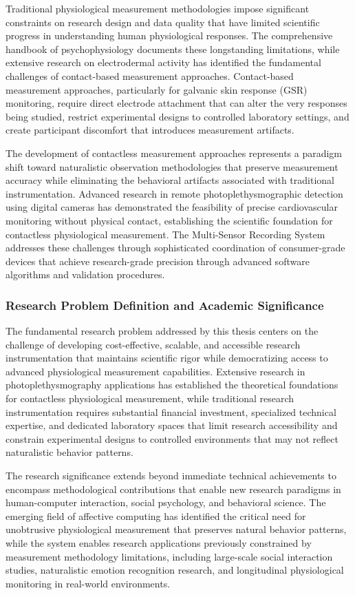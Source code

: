 \documentclass[11pt,a4paper]{report}
\begin{document}
Traditional physiological measurement methodologies impose significant constraints on research design and data quality
that have limited scientific progress in understanding human physiological responses. The comprehensive handbook of
psychophysiology documents these longstanding limitations, while extensive research on electrodermal activity has
identified the fundamental challenges of contact-based measurement approaches. Contact-based measurement approaches,
particularly for galvanic skin response (GSR) monitoring, require direct electrode attachment that can alter the very
responses being studied, restrict experimental designs to controlled laboratory settings, and create participant
discomfort that introduces measurement artifacts.

The development of contactless measurement approaches represents a paradigm shift toward naturalistic observation
methodologies that preserve measurement accuracy while eliminating the behavioral artifacts associated with traditional
instrumentation. Advanced research in remote photoplethysmographic detection using digital cameras has demonstrated the
feasibility of precise cardiovascular monitoring without physical contact, establishing the scientific foundation for
contactless physiological measurement. The Multi-Sensor Recording System addresses these challenges through
sophisticated coordination of consumer-grade devices that achieve research-grade precision through advanced software
algorithms and validation procedures.

\subsubsection{Research Problem Definition and Academic Significance}

The fundamental research problem addressed by this thesis centers on the challenge of developing cost-effective,
scalable, and accessible research instrumentation that maintains scientific rigor while democratizing access to advanced
physiological measurement capabilities. Extensive research in photoplethysmography applications has established the
theoretical foundations for contactless physiological measurement, while traditional research instrumentation requires
substantial financial investment, specialized technical expertise, and dedicated laboratory spaces that limit research
accessibility and constrain experimental designs to controlled environments that may not reflect naturalistic behavior
patterns.

The research significance extends beyond immediate technical achievements to encompass methodological contributions that
enable new research paradigms in human-computer interaction, social psychology, and behavioral science. The emerging
field of affective computing has identified the critical need for unobtrusive physiological measurement that preserves
natural behavior patterns, while the system enables research applications previously constrained by measurement
methodology limitations, including large-scale social interaction studies, naturalistic emotion recognition research,
and longitudinal physiological monitoring in real-world environments.
\end{document}
